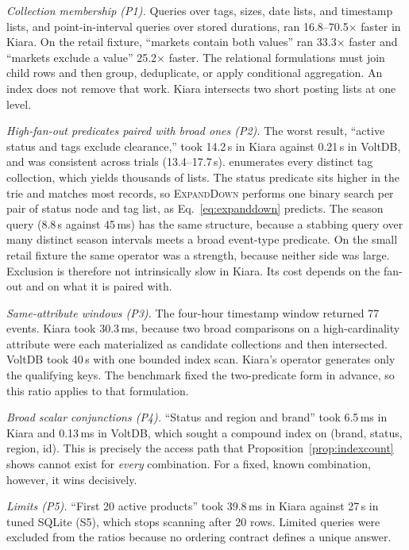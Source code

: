 \emph{Collection membership (P1).} Queries over tags, sizes, date lists, and timestamp lists, and point-in-interval queries over stored durations, ran 16.8--70.5$\times$ faster in Kiara. On the retail fixture, ``markets contain both values'' ran 33.3$\times$ faster and ``markets exclude a value'' 25.2$\times$ faster. The relational formulations must join child rows and then group, deduplicate, or apply conditional aggregation. An index does not remove that work. Kiara intersects two short posting lists at one level.

\emph{High-fan-out predicates paired with broad ones (P2).} The worst result, ``active status and tags exclude clearance,'' took 14.2\,s in Kiara against 0.21\,s in VoltDB, and was consistent across trials (13.4--17.7\,s).  enumerates every distinct tag collection, which yields thousands of lists. The status predicate sits higher in the trie and matches most records, so \textsc{ExpandDown} performs one binary search per pair of status node and tag list, as Eq.~\eqref{eq:expanddown} predicts. The season query (8.8\,s against 45\,ms) has the same structure, because a stabbing query over many distinct season intervals meets a broad event-type predicate. On the small retail fixture the same operator was a strength, because neither side was large. Exclusion is therefore not intrinsically slow in Kiara. Its cost depends on the fan-out and on what it is paired with.

\emph{Same-attribute windows (P3).} The four-hour timestamp window returned 77 events. Kiara took 30.3\,ms, because two broad comparisons on a high-cardinality attribute were each materialized as candidate collections and then intersected. VoltDB took 40\,\textmu s with one bounded index scan. Kiara's  operator generates only the qualifying keys. The benchmark fixed the two-predicate form in advance, so this ratio applies to that formulation.

\emph{Broad scalar conjunctions (P4).} ``Status and region and brand'' took 6.5\,ms in Kiara and 0.13\,ms in VoltDB, which sought a compound index on (brand, status, region, id). This is precisely the access path that Proposition~\ref{prop:indexcount} shows cannot exist for \emph{every} combination. For a fixed, known combination, however, it wins decisively.

\emph{Limits (P5).} ``First 20 active products'' took 39.8\,ms in Kiara against 27\,\textmu s in tuned SQLite (S5), which stops scanning after 20 rows. Limited queries were excluded from the ratios because no ordering contract defines a unique answer.

